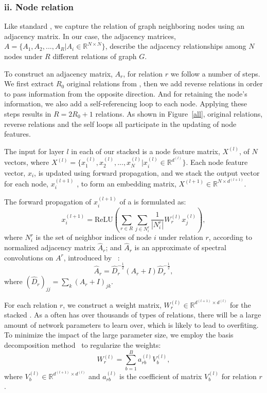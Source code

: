  \subsubsection{ii. Node relation}
 Like standard \RGCNs, we capture the relation of graph neighboring nodes using an adjacency matrix.
 In our case, the adjacency matrices, $A=\{A_1,A_2,...,A_R |A_i \in \mathbb{R}^{N
 \times N} \}$, describe the adjacency relationships among $N$ nodes under $R$ different relations of graph $G$.

 To construct an adjacency matrix, $A_r$, for relation $r$ we follow a number of steps. We first extract $R_0$ original
 relations from \KGs, then we add reverse relations in order to pass information from the opposite direction. And for retaining the node's information, we also add a self-referencing loop to each node. Applying these steps results in $R=2R_0+1$ relations. As shown in Figure~\ref{all}, original relations, reverse relations and the self loops all participate in the updating of node features.

 The input for layer $l$ in each of our stacked \RGCNs is a node feature matrix, $X^{(l)}$, of $N$ vectors, where  $X^{(l)} =\{x^{(l)}_1,x^{(l)}_2,...,x^{(l)}_{N}
 |x^{(l)}_{i} \in \mathbb{R}^{d^{(l)}}\}$. Each node feature vector, $x_i$, is updated using forward propagation, and we stack the output vector for each node, $x_i^{(l+1)}$
 , to form an embedding matrix, $X^{(l+1)} \in \mathbb{R}^{N \times d^{(l+1)}}$.

   The forward propagation of $x_i^{(l+1)}$ of a \RGCN is formulated as:
	\begin{equation}
	x_i^{(l+1)}=\mathrm{ReLU} (\sum\limits_{r \in R}\sum\limits_{j \in N_i^r}\frac{1}{|N_i^r|}W_r^{(l)}x_j^{(l)}),
	\end{equation}
where $N_i^r$ is the set of neighbor indices of node $i$ under relation $r$, according to normalized adjacency matrix $\hat A_r$; and $\hat
A_r$ is an approximate of spectral convolutions on $A^r$, introduced by ~\cite{Kipf2016Semi}:
	\begin{equation}
	\hat A_r=\hat D_r^{- \frac{1}{2}}(A_r+I)\hat D_r^{- \frac{1}{2}},
	\end{equation}
	where $(\hat D_r)_{jj}=\sum_k(A_r+I)_{jk}$.

	
	 For each relation $r$, we construct a weight matrix, $W_r^{(l)} \in \mathbb{R}^{d^{(l+1)}
\times d^{(l)}}$ for the stacked \RGCNs. As a \KG often has over thousands of types of relations, there will be a large amount of network
parameters to learn over, which is likely to lead to overfiting. To minimize the impact of the large parameter size, we employ the basis
decomposition method~\cite{Schlichtkrull2017Modeling} to regularize the weights:
	\begin{equation}
	W_r^{(l)}=\sum\limits_{b=1}^B a_{rb}^{(l)}V_b^{(l)},
	\end{equation}
	where $V_b^{(l)} \in \mathbb{R}^{d^{(l+1)} \times d^{(l)}}$ and $a_{rb}^{(l)}$ is the coefficient of matrix $V_b^{(l)}$ for relation $r$.
	
